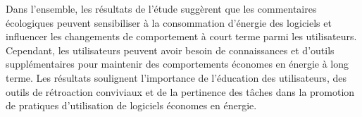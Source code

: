 Dans l’ensemble, les résultats de l’étude suggèrent que les commentaires écologiques peuvent sensibiliser à la consommation d’énergie des logiciels et influencer les changements de comportement à court terme parmi les utilisateurs. Cependant, les utilisateurs peuvent avoir besoin de connaissances et d'outils supplémentaires pour maintenir des comportements économes en énergie à long terme. Les résultats soulignent l’importance de l’éducation des utilisateurs, des outils de rétroaction conviviaux et de la pertinence des tâches dans la promotion de pratiques d’utilisation de logiciels économes en énergie.
